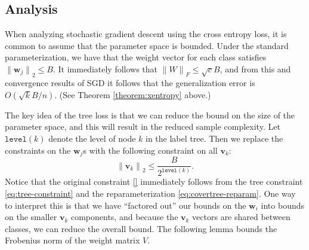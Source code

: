 \documentclass[twoside]{article}
\theoremstyle{definition}
\newcommand{\vv}{\mathbf v}
\newcommand{\w}{\mathbf w}
\newcommand{\ltwo}[1]{{\lVert {#1} \rVert}_2}
\newcommand{\lF}[1]{{\lVert {#1} \rVert}_F}
\newcommand{\level}[1]{\texttt{level}({#1})}
\begin{document}
\subsection{Analysis}

When analyzing stochastic gradient descent using the cross entropy loss,
it is common to assume that the parameter space is bounded.
Under the standard parameterization, we have that the weight vector for each class satisfies $\ltwo{\w_j} \le B$.
It immediately follows that $\lF{W} \le \sqrt{c}B$,
and from this and convergence results of SGD it follows that the generalization error is $O(\sqrt{k}B/n)$.
(See Theorem \ref{theorem:xentropy} above.)

The key idea of the tree loss is that we can reduce the bound on the size of the parameter space,
and this will result in the reduced sample complexity.
Let $\level k$ denote the level of node $k$ in the label tree.
Then we replace the constraints on the $\w_j$s with the following constraint on all $\vv_k$:
\begin{equation}
    \ltwo{\vv_k} \le \frac{B}{2^{\level k}}
    .
    \label{eq:tree-constraint}
\end{equation}
Notice that the original constraint \eqref{} immediately follows from the tree constraint \eqref{eq:tree-constraint} and the reparameterization \eqref{eq:covertree-reparam}.
One way to interpret this is that we have ``factored out'' our bounds on the $\w_i$ into bounds on the smaller $\vv_k$ components,
and because the $\vv_k$ vectors are shared between classes,
we can reduce the overall bound.
The following lemma bounds the Frobenius norm of the weight matrix $V$.
\end{document}

